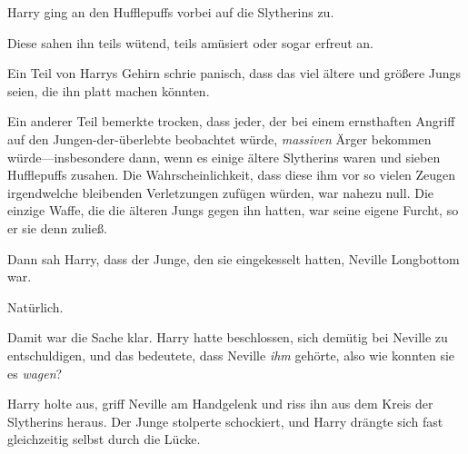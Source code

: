 Harry ging an den Hufflepuffs vorbei auf die Slytherins zu.

Diese sahen ihn teils wütend, teils amüsiert oder sogar erfreut an.

Ein Teil von Harrys Gehirn schrie panisch, dass das viel ältere und größere Jungs seien, die ihn platt machen könnten.

Ein anderer Teil bemerkte trocken, dass jeder, der bei einem ernsthaften Angriff auf den Jungen-der-überlebte beobachtet würde, \emph{massiven} Ärger bekommen würde—insbesondere dann, wenn es einige ältere Slytherins waren und sieben Hufflepuffs zusahen. Die Wahrscheinlichkeit, dass diese ihm vor so vielen Zeugen irgendwelche bleibenden Verletzungen zufügen würden, war nahezu null. Die einzige Waffe, die die älteren Jungs gegen ihn hatten, war seine eigene Furcht, so er sie denn zuließ.

Dann sah Harry, dass der Junge, den sie eingekesselt hatten, Neville Longbottom war.

Natürlich.

Damit war die Sache klar. Harry hatte beschlossen, sich demütig bei Neville zu entschuldigen, und das bedeutete, dass Neville \emph{ihm} gehörte, also wie konnten sie es \emph{wagen}?

Harry holte aus, griff Neville am Handgelenk und riss ihn aus dem Kreis der Slytherins heraus. Der Junge stolperte schockiert, und Harry drängte sich fast gleichzeitig selbst durch die Lücke.

